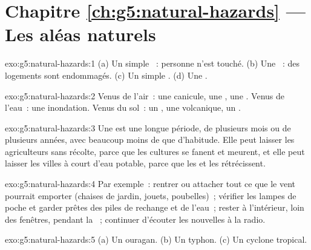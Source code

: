 \section*{Chapitre \ref{ch:g5:natural-hazards} --- Les aléas naturels}

\begin{solution}{exo:g5:natural-hazards:1}
(a) Un simple ~: personne n'est touché. (b) Une ~: des logements sont endommagés. (c) Un simple .
(d) Une .
\end{solution}

\begin{solution}{exo:g5:natural-hazards:2}
Venus de l'air~: une canicule, une , une . Venus de
l'eau~: une inondation. Venus du sol~: un , une
 volcanique, un .
\end{solution}

\begin{solution}{exo:g5:natural-hazards:3}
Une  est une longue période, de plusieurs mois ou de plusieurs
années, avec beaucoup moins de  que d'habitude. Elle peut laisser les
agriculteurs sans récolte, parce que les cultures se fanent et meurent, et
elle peut laisser les villes à court d'eau potable, parce que les 
et les  rétrécissent.
\end{solution}

\begin{solution}{exo:g5:natural-hazards:4}
Par exemple~: rentrer ou attacher tout ce que le vent pourrait emporter
(chaises de jardin, jouets, poubelles)~; vérifier les lampes de poche et
garder prêtes des piles de rechange et de l'eau~; rester à l'intérieur,
loin des fenêtres, pendant la ~; continuer d'écouter les nouvelles
à la radio.
\end{solution}

\begin{solution}{exo:g5:natural-hazards:5}
(a) Un ouragan. (b) Un typhon. (c) Un cyclone tropical.
\end{solution}

